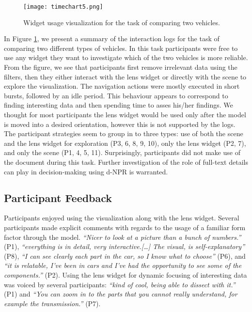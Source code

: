 	\begin{figure}
	 \centering  
	 \texttt{[image: timechart5.png]}  
	 \caption[Log Visualization.]{Widget usage visualization for the task of comparing two vehicles.}
	 \label{figure:timechart}
	\end{figure}

In Figure \ref{figure:timechart}, we present a summary of the interaction logs
for the task of comparing two different types of vehicles. In this task
participants were free to use any widget they want to investigate which of the
two vehicles is more reliable. From the figure, we see that participants first
remove irrelevant data using the filters, then they either interact with 
the lens widget or directly with the \threed scene to explore the visualization.
The navigation actions were mostly executed in short bursts, followed by an idle
period. This behaviour appears to correspond to finding interesting data and
then spending time to asses his/her findings. We thought for most participants
the lens widget would be used only after the \threed model is moved into a
desired orientation, however this is not supported by the logs. The participant
strategies seem to group in to three types: use of both the \threed scene and
the lens widget for exploration (P3, 6, 8, 9, 10), only the lens widget (P2, 7),
and only the \threed scene (P1, 4, 5, 11). Surprisingly, participants did not
make use of the document during this task. Further investigation of the role of
full-text details can play in decision-making using d-NPR is warranted.


 
\subsection{Participant Feedback}
Participants enjoyed using the \threed visualization along with the lens widget.
Several participants made explicit comments with regards to the usage of a
familiar form factor through the \threed model. \emph{``Nicer to look at a
picture than a bunch of numbers.''} (P1), \emph{``everything is in detail, very
interactive.[\ldots] The visual, is self-explanatory''} (P8), \emph{``I can see
clearly each part in the car, so I know what to choose''} (P6), and \emph{``it is
relatable, I've been in cars and I've had the opportunity to see some of the
components.''} (P2). Using the lens widget for dynamic focusing of interesting
data was voiced by several participants: \emph{``kind of cool, being able to
dissect with it.''} (P1) and \emph{``You can zoom in to the parts that you
cannot really understand, for example the transmission.''} (P7).

